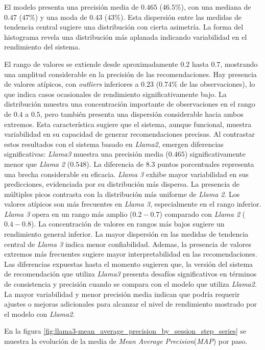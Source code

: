 \documentclass[11pt,a4paper,twoside]{thesis}
\begin{document}
El modelo presenta una precisión media de $0.465$ ($46.5\%$), con una mediana de $0.47$ ($47\%$) y una moda de $0.43$ ($43\%$). Esta dispersión entre las medidas de tendencia central sugiere una distribución con cierta asimetría. La forma del histograma revela una distribución más aplanada indicando variabilidad en el rendimiento del sistema.

El rango de valores se extiende desde aproximadamente $0.2$ hasta $0.7$, mostrando una amplitud considerable en la precisión de las recomendaciones. Hay presencia de valores atípicos, con \textit{outliers} inferiores a $0.23$ ($0.74\%$ de las observaciones), lo que indica casos ocasionales de rendimiento significativamente bajo. La distribución muestra una concentración importante de observaciones en el rango de $0.4$ a $0.5$, pero también presenta una dispersión considerable hacia ambos extremos. Esta característica sugiere que el sistema, aunque funcional, muestra variabilidad en su capacidad de generar recomendaciones precisas. Al contrastar estos resultados con el sistema basado en \textit{Llama2}, emergen diferencias significativas: \textit{Llama3} muestra una precisión media ($0.465$) significativamente menor que \textit{Llama 2} ($0.548$). La diferencia de $8.3$ puntos porcentuales representa una brecha considerable en eficacia. \textit{Llama 3} exhibe mayor variabilidad en sus predicciones, evidenciada por su distribución más dispersa. La presencia de múltiples picos contrasta con la distribución más uniforme de \textit{Llama 2}. Los valores atípicos son más frecuentes en \textit{Llama 3}, especialmente en el rango inferior. \textit{Llama 3} opera en un rango más amplio ($0.2-0.7$) comparado con \textit{Llama 2} ($0.4-0.8$). La concentración de valores en rangos más bajos sugiere un rendimiento general inferior. La mayor dispersión en las medidas de tendencia central de \textit{Llama 3} indica menor confiabilidad. Ademas, la presencia de valores extremos más frecuentes sugiere mayor interpretabilidad en las recomendaciones. Las diferencias expuestas hasta el momento sugieren que, la versión del sistema de recomendación que utiliza \textit{Llama3} presenta desafíos significativos en términos de consistencia y precisión cuando se compara con el modelo que utiliza \textit{Llama2}. La mayor variabilidad y menor precisión media indican que podría requerir ajustes o mejoras adicionales para alcanzar el nivel de rendimiento mostrado por el modelo con \textit{Llama2}.

\clearpage

En la figura \ref{fig:llama3-mean_average_precision_by_session_step_series} se muestra la evolución de la media de \textit{Mean Average Precision}(\textit{MAP}) por paso.
\end{document}
